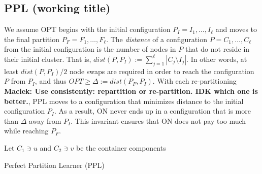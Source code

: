 \documentclass[manuscript,screen=true]{acmart}
\newcommand{\OPT}{\mathit{OPT}}
\DeclarePairedDelimiter\set{\{}{\}}
\newcommand\maciek[1]{\color{brown}\textbf{\\ Maciek: #1}\color{black}}
\begin{document}
\subsection{PPL (working title)}
     
We assume OPT begins with the initial configuration
$P_I = I_1, \dots, I_{\ell}$ and moves to the final partition
$P_F = F_1, \dots, F_{\ell}$.
 The \emph{distance} of a configuration $P = C_1, \dots, C_{\ell}$ from the initial configuration is the number of nodes in $P$ that do not reside in their initial cluster.
    That is,
    $\mathit{dist}(P, P_I) := \sum_{j=1}^{\ell} | C_j \setminus I_j |$. 
In other words,
at least $\mathit{dist}(P, P_I)/2$ node swaps are required in order to reach the configuration $P$ from $P_I$, and thus
$\OPT \geq \Delta:= dist(P_F, P_I) $.
 With each re-partitioning\maciek{Use consistently: repartition or re-partition. IDK which one is better.},
  PPL moves to a configuration that minimizes distance to the initial configuration $P_I$.
As a result,
ON never ends up in a configuration that is more than $\Delta$ away from $P_I$.
This invariant ensures that ON does not pay too much while reaching $P_F$.


\begin{algorithm}
    \renewcommand{\algorithmicrequire}{\textbf{Input:}}
    \renewcommand{\algorithmicensure}{\textbf{Output:}}
    \begin{algorithmic}
         \label{line:initcomponents}
        \STATE Let $C_1 \ni u$ and $C_2 \ni v$ be the container components
         \label{line:mergecomponents}
        \label{line:rebalance} 
        \ENDIF
        \ENDIF
        \ENDFOR
    \end{algorithmic}
    \caption{Perfect Partition Learner (PPL)}
    \label{alg:ppl}
      \end{algorithm}
  
\end{document}
